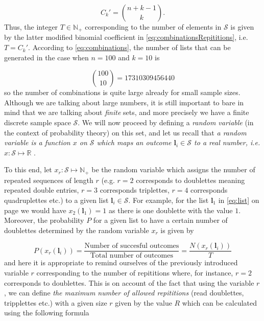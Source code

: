 \documentclass{article}
\begin{document}
\begin{equation}
C_k'={n+k-1\choose k}. 
  \label{eq:combinationsRepititions}
\end{equation}
Thus, the integer $T\in\mathbb{N}_+$ corresponding to the number of elements in $\mathcal{S}$ is given by the latter modified binomial coefficient in \eqref{eq:combinationsRepititions}, i.e. $T=C_k'$. According to \eqref{eq:combinations}, the number of lists that can be generated in the case when $n=100$ and $k=10$ is

$${100\choose 10}= 17310309456440$$
so the number of combinations is quite large already for small sample sizes.
Although we are talking about large numbers, it is still important to bare in mind that we are talking about \textit{finite} sets, and more precisely we have a finite discrete sample space $\mathcal{S}$. We will now proceed by defining a \textit{random variable} (in the context of probability theory) on this set, and let us recall that \textit{a random variable is a function $x$ on $\mathcal{S}$ which maps an outcome $\mathbf{l}_i\in\mathcal{S}$ to a real number, i.e. $x:\mathcal{S}\mapsto\mathbb{R}$} \cite{devore2008probability,rice2006mathematical}.

To this end, let $x_r:\mathcal{S}\mapsto\mathbb{N}_+$ be the random variable which assigns the number of repeated sequences of length $r$ (e.g. $r=2$ corresponds to doublettes meaning repeated double entries, $r=3$ corresponds triplettes, $r=4$ corresponds quadruplettes etc.) to a given list $\mathbf{l}_i\in\mathcal{S}$. For example, for the list $\mathbf{l}_1$ in \eqref{eq:list} on page \pageref{eq:list} we would have $x_2(\mathbf{l}_1)=1$ as there is one doublette with the value $1$. Moreover, the probability $P$ for a given list to have a certain number of doublettes determined by the random variable $x_r$ is given by

\begin{equation}
P(x_r(\mathbf{l}_i))=\dfrac{\textrm{Number of succesful outcomes}}{\textrm{Total number of outcomes}}=\dfrac{N(x_r(\mathbf{l}_i))}{T}
\label{eq:probability}
\end{equation}
and here it is appropriate to remind ourselves of the previously introduced variable $r$ corresponding to the number of repititions where, for instance, $r=2$ corresponds to doublettes. This is on account of the fact that using the variable $r$, we can define \textit{the maximum number of allowed repititions} (read doublettes, tripplettes etc.) with a given size $r$ given by the value $R$ which can be calculated using the following formula
\end{document}
